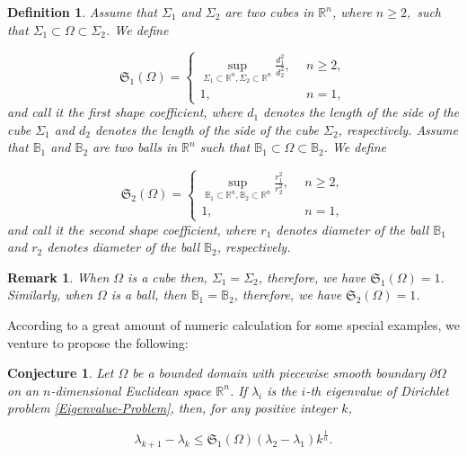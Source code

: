 \documentclass[12pt]{article}
\newtheorem{defn}[{thm}]{Definition}
\newtheorem{con}[thm]{Conjecture}
\newtheorem{rem}[thm]{Remark}
\numberwithin{equation}{section}
\begin{document}
\begin{defn}Assume that $\Sigma_{1}$ and $\Sigma_{2}$ are two cubes  in $\mathbb{R}^{n}$, where $n\geq2,$ such that $\Sigma_{1}\subset\Omega\subset\Sigma_{2}$. We define

\begin{equation*}\mathfrak{S}_{1}(\Omega)=
\left\{ \begin{aligned}  \sup_{\Sigma_{1}\subset\mathbb{R}^{n},\Sigma_{2}\subset\mathbb{R}^{n}}\frac{d_{1}^{2}}{d_{2}^{2}},\ \ &n\geq2,
         \\
1,\ \ &n=1,
                          \end{aligned} \right.
                          \end{equation*}
and call it the first shape coefficient,  where $d_{1}$ denotes the length of the side of the cube $\Sigma_{1}$ and $d_{2}$ denotes the length of the side of the cube $\Sigma_{2}$, respectively.
Assume that $\mathbb{B}_{1}$ and $\mathbb{B}_{2}$ are two balls  in $\mathbb{R}^{n}$ such that $\mathbb{B}_{1}\subset\Omega\subset\mathbb{B}_{2}$. We define

\begin{equation*}\mathfrak{S}_{2}(\Omega)=
\left\{ \begin{aligned}  \sup_{\mathbb{B}_{1}\subset\mathbb{R}^{n},\mathbb{B}_{2}\subset\mathbb{R}^{n}}\frac{r_{1}^{2}}{r_{2}^{2}},\ \ &n\geq2,
         \\
1,\ \ &n=1,
                          \end{aligned} \right.
\end{equation*} and call it the second shape coefficient,  where $r_{1}$ denotes diameter  of the ball $\mathbb{B}_{1}$ and $r_{2}$ denotes diameter  of the ball $\mathbb{B}_{2}$, respectively.
\end{defn}
\begin{rem}When $\Omega$ is a cube then, $\Sigma_{1}=\Sigma_{2}$, therefore, we have
$\mathfrak{S}_{1}(\Omega)=1$. Similarly, when $\Omega$ is a ball, then $\mathbb{B}_{1}=\mathbb{B}_{2}$, therefore, we have
$\mathfrak{S}_{2}(\Omega)=1$.\end{rem}
According to a great amount of  numeric calculation for some special examples,  we venture to propose the following:
\begin{con}\label{gap-conj-z}
Let $\Omega$ be a bounded domain with piecewise smooth boundary $\partial\Omega$ on an $n$-dimensional Euclidean space
$\mathbb{R}^{n}$.  If $\lambda_{i}$ is the $i$-th eigenvalue of Dirichlet problem \eqref{Eigenvalue-Problem}, then, for any positive integer $k$,


\begin{equation}\label{con-z-1} \lambda_{k+1}-\lambda_{k}\leq \mathfrak{S}_{1}(\Omega)(\lambda_{2}-\lambda_{1})k^{\frac{1}{n}}.
\end{equation}
\end{con}
\end{document}
